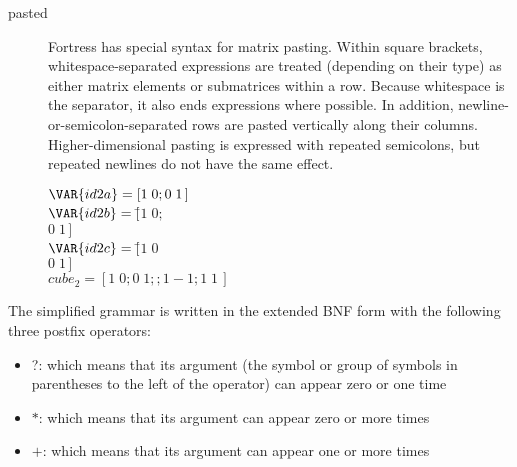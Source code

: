 \begin{description}
\item[pasted]
Fortress has special syntax for matrix pasting.  Within square
brackets, whitespace-separated expressions are treated (depending
on their type) as either matrix elements or submatrices within a
row.  Because whitespace is the separator, it also ends expressions
where possible.  In addition, newline-or-semicolon-separated
rows are pasted vertically along their columns.  Higher-dimensional
pasting is expressed with repeated semicolons, but repeated newlines
do not have the same effect.
\begin{Fortress}
\(\VAR{id2a} = [1\;0 ; 0\;1\,]\)\\
\(\VAR{id2b} = [\null\)\pushtabs\=\+\(1\;0 ;\)\\
\(         0\;1\,]\)\-\\\poptabs
\(\VAR{id2c} = [\null\)\pushtabs\=\+\(1\;0\)\\
\(         0\;1\,]\)\-\\\poptabs
\({cube}_{2} = [1\;0 ; 0\;1 ;; 1 -1 ; 1\;1\,]\)
\end{Fortress}

\end{description}


The simplified grammar is written in the extended BNF form
with the following three postfix operators:
\begin{itemize}
\item ?: which means that its argument (the symbol or group of symbols in
  parentheses to the left of the operator) can appear zero or one time
\item $*$: which means that its argument can appear zero or more times
\item $+$: which means that its argument can appear one or more times
\end{itemize}


